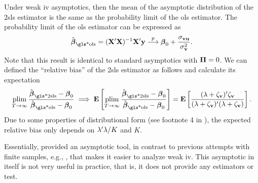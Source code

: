 \documentclass[a4paper]{article}
\begin{document}
\begin{remark} %
	Under weak \gls*{iv} asymptotics,
	then the mean of the asymptotic distribution of the \gls*{2sls} estimator is the same as the probability limit of the \gls*{ols} estimator.
	The probability limit of the \gls*{ols} estimator can be expressed as
	\begin{align*}
		\hat\bbeta_{\text{\gls*{ols}}} = (\XX\T\XX)\inv\XX\T\yy \pto \bbeta_0 + \frac{\sigma_{\vv\uu}}{\sigma_{\vv}^2}.
	\end{align*}
	Note that this result is identical to standard asymptotics with $\boldsymbol{\Pi}=0$.
	We can defined the ``relative bias'' of the \gls*{2sls} estimator as follows and calculate its expectation
	\begin{align*}
		\plim_{T\to\infty}\frac{\hat\bbeta_{\text{\gls*{2sls}}}-\bbeta_0}{\hat\bbeta_{\text{\gls*{ols}}}-\bbeta_0}
		\implies \E \left[ \plim_{T\to\infty}\frac{\hat\bbeta_{\text{\gls*{2sls}}}-\bbeta_0}{\hat\bbeta_{\text{\gls*{ols}}}-\bbeta_0} \right]
		= \E \left[ \frac{(\lambda + \zeta_{\vv})\T\zeta_{\vv}}{(\lambda + \zeta_{\vv})\T(\lambda + \zeta_{\vv})} \right].
	\end{align*}
	Due to some properties of distributional form (see footnote 4 in \textcite{staiger-stock-1997}),
	the expected relative bias only depends on $\lambda'\lambda/K$ and $K$.
\end{remark}


\begin{remark}
	Essentially,
	\textcite{staiger-stock-1997} provided an asymptotic tool,
	in contrast to previous attempts with finite samples, e.g., \textcite{rothenberg-1984},
	that makes it easier to analyze weak \gls*{iv}.
	This asymptotic in itself is not very useful in practice,
	that is, it does not provide any estimators or test.
\end{remark}
\end{document}
